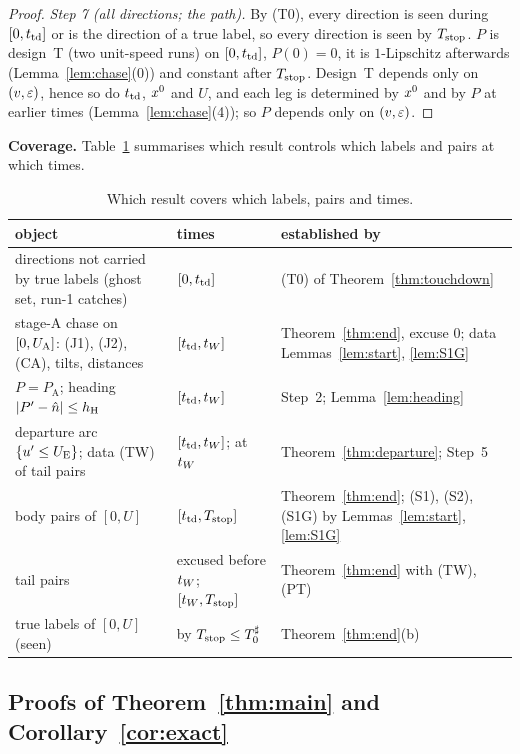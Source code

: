 \begin{proof}
\emph{Step 7 (all directions; the path).} By (T0), every direction is seen during $[0,t_{\mathrm{td}}]$ or is the direction of a true label, so
every direction is seen by $T_{\mathrm{stop}}$. $P$ is design~T (two unit-speed runs) on $[0,t_{\mathrm{td}}]$, $P(0)=0$, it is $1$-Lipschitz afterwards
(Lemma~\ref{lem:chase}(0)) and constant after $T_{\mathrm{stop}}$. Design~T depends only on $(v,\varepsilon)$, hence so do $t_{\mathrm{td}}$, $x^0$ and $U$, and
each leg is determined by $x^0$ and by $P$ at earlier times (Lemma~\ref{lem:chase}(4)); so $P$ depends only on $(v,\varepsilon)$.
\end{proof}

\noindent\textbf{Coverage.} Table~\ref{tab:cover} summarises which result controls which labels and pairs at which times.
\begin{table}[ht]
\centering\small
\begin{tabular}{@{}p{}p{}p{}@{}}
\toprule
object & times & established by\\
\midrule
directions not carried by true labels (ghost set, run-1 catches) & $[0,t_{\mathrm{td}}]$ & (T0) of Theorem~\ref{thm:touchdown}\\
stage-A chase on $[0,U_{\mathrm A}]$: (J1), (J2), (CA), tilts, distances & $[t_{\mathrm{td}},t_W]$ & Theorem~\ref{thm:end}, excuse $0$; data Lemmas~\ref{lem:start}, \ref{lem:S1G}\\
$P=P_{\mathrm A}$; heading $|P'-\hat n|\le h_{\mathrm H}$ & $[t_{\mathrm{td}},t_W]$ & Step~2; Lemma~\ref{lem:heading}\\
departure arc $\{u'\le U_{\mathrm E}\}$; data (TW) of tail pairs & $[t_{\mathrm{td}},t_W]$; at $t_W$ & Theorem~\ref{thm:departure}; Step~5\\
body pairs of $[0,U]$ & $[t_{\mathrm{td}},T_{\mathrm{stop}}]$ & Theorem~\ref{thm:end}; (S1), (S2), (S1G) by Lemmas~\ref{lem:start}, \ref{lem:S1G}\\
tail pairs & excused before $t_W$; $[t_W,T_{\mathrm{stop}}]$ & Theorem~\ref{thm:end} with (TW), (PT)\\
true labels of $[0,U]$ (seen) & by $T_{\mathrm{stop}}\le T_0^\sharp$ & Theorem~\ref{thm:end}(b)\\
\bottomrule
\end{tabular}
\caption{Which result covers which labels, pairs and times.}\label{tab:cover}
\end{table}

\subsection{Proofs of Theorem~\ref{thm:main} and Corollary~\ref{cor:exact}}

